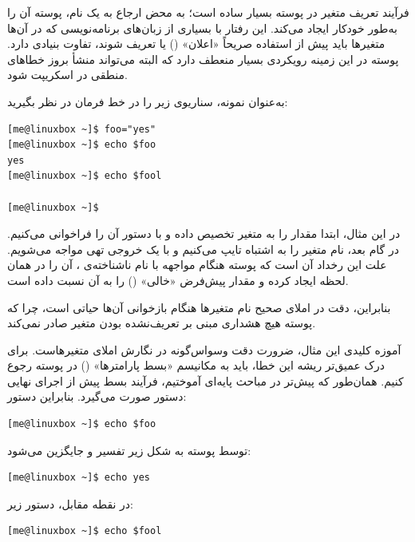 فرآیند تعریف متغیر در پوسته بسیار ساده است؛ به محض ارجاع به یک نام، پوسته آن را به‌طور خودکار ایجاد می‌کند. این رفتار با بسیاری از زبان‌های برنامه‌نویسی که در آن‌ها متغیرها باید پیش از استفاده صریحاً «اعلان» () یا تعریف شوند، تفاوت بنیادی دارد. پوسته در این زمینه رویکردی بسیار منعطف دارد که البته می‌تواند منشأ بروز خطاهای منطقی در اسکریپت شود.

به‌عنوان نمونه، سناریوی زیر را در خط فرمان در نظر بگیرید:

\begin{latin}
\begin{lstlisting}
[me@linuxbox ~]$ foo="yes"
[me@linuxbox ~]$ echo $foo
yes
[me@linuxbox ~]$ echo $fool

[me@linuxbox ~]$
\end{lstlisting}
\end{latin}

در این مثال، ابتدا مقدار  را به متغیر  تخصیص داده و با دستور  آن را فراخوانی می‌کنیم. در گام بعد، نام متغیر را به اشتباه  تایپ می‌کنیم و با یک خروجی تهی مواجه می‌شویم. علت این رخداد آن است که پوسته هنگام مواجهه با نام ناشناخته‌ی ، آن را در همان لحظه ایجاد کرده و مقدار پیش‌فرض «خالی» () را به آن نسبت داده است.

بنابراین، دقت در املای صحیح نام متغیرها هنگام بازخوانی آن‌ها حیاتی است، چرا که پوسته هیچ هشداری مبنی بر تعریف‌نشده بودن متغیر صادر نمی‌کند.

آموزه کلیدی این مثال، ضرورت دقت وسواس‌گونه در نگارش املای متغیرهاست. برای درک عمیق‌تر ریشه این خطا، باید به مکانیسم «بسط پارامترها» () در پوسته رجوع کنیم. همان‌طور که پیش‌تر در مباحث پایه‌ای آموختیم، فرآیند بسط پیش از اجرای نهایی دستور صورت می‌گیرد. بنابراین دستور:

\begin{latin}
\begin{lstlisting}
[me@linuxbox ~]$ echo $foo
\end{lstlisting}
\end{latin}

توسط پوسته به شکل زیر تفسیر و جایگزین می‌شود:

\begin{latin}
\begin{lstlisting}
[me@linuxbox ~]$ echo yes
\end{lstlisting}
\end{latin}

در نقطه مقابل، دستور زیر:

\begin{latin}
\begin{lstlisting}
[me@linuxbox ~]$ echo $fool
\end{lstlisting}
\end{latin}

